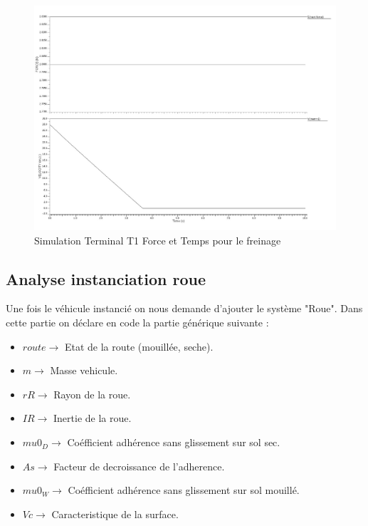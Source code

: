 \begin{figure}[h]
    \centering
    \includegraphics[width=\textwidth]{images/Instanciation_vehicule.jpg}
    \caption{Simulation Terminal T1 Force et Temps pour le freinage}
\end{figure}

\subsection{Analyse instanciation roue}
Une fois le véhicule instancié on nous demande d'ajouter le système "Roue". Dans cette partie on déclare en code la partie générique suivante :\\
\begin{itemize}
    \item $route       \rightarrow$ Etat de la route (mouillée, seche).
    \item $m       \rightarrow$ Masse vehicule.
    \item $rR        \rightarrow$ Rayon de la roue.
    \item $IR  \rightarrow$ Inertie de la roue.
    \item $mu0_D \rightarrow$ Coéfficient adhérence sans glissement sur sol sec.
    \item $As \rightarrow$ Facteur de decroissance de l'adherence.
    \item $mu0_W \rightarrow$ Coéfficient adhérence sans glissement sur sol mouillé.
    \item $Vc \rightarrow$ Caracteristique de la surface.
\end{itemize}
\newpage

